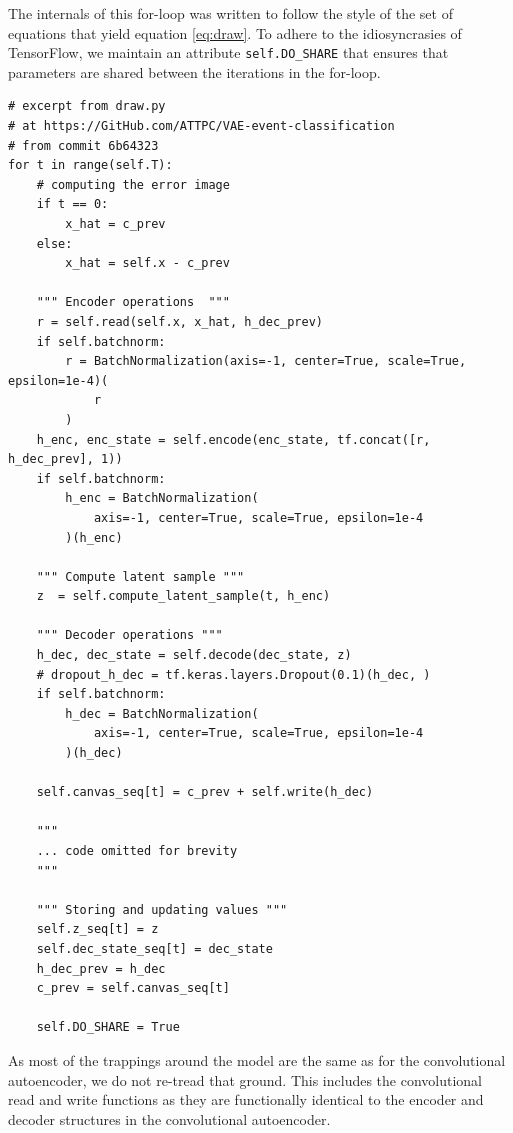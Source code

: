 The internals of this for-loop was written to follow the style of the set of equations that yield equation \ref{eq:draw}. To adhere to the idiosyncrasies of TensorFlow, we maintain an attribute \lstinline{self.DO_SHARE} that ensures that parameters are shared between the iterations in the for-loop.

\begin{minipage}{\linewidth}
\begin{lstlisting}[language=iPython]
# excerpt from draw.py
# at https://GitHub.com/ATTPC/VAE-event-classification
# from commit 6b64323
for t in range(self.T):
	# computing the error image
	if t == 0:
	    x_hat = c_prev
	else:
	    x_hat = self.x - c_prev

	""" Encoder operations  """
	r = self.read(self.x, x_hat, h_dec_prev)
	if self.batchnorm:
	    r = BatchNormalization(axis=-1, center=True, scale=True, epsilon=1e-4)(
	        r
	    )
	h_enc, enc_state = self.encode(enc_state, tf.concat([r, h_dec_prev], 1))
	if self.batchnorm:
	    h_enc = BatchNormalization(
	        axis=-1, center=True, scale=True, epsilon=1e-4
	    )(h_enc)

	""" Compute latent sample """
	z  = self.compute_latent_sample(t, h_enc)

	""" Decoder operations """
	h_dec, dec_state = self.decode(dec_state, z)
	# dropout_h_dec = tf.keras.layers.Dropout(0.1)(h_dec, )
	if self.batchnorm:
	    h_dec = BatchNormalization(
	        axis=-1, center=True, scale=True, epsilon=1e-4
	    )(h_dec)

	self.canvas_seq[t] = c_prev + self.write(h_dec)

	"""
	... code omitted for brevity
	"""

	""" Storing and updating values """
	self.z_seq[t] = z
	self.dec_state_seq[t] = dec_state
	h_dec_prev = h_dec
	c_prev = self.canvas_seq[t]

	self.DO_SHARE = True
\end{lstlisting}
\end{minipage}

As most of the trappings around the model are the same as for the convolutional autoencoder, we do not re-tread that ground. This includes the convolutional read and write functions as they are functionally identical to the encoder and decoder structures in the convolutional autoencoder. 

